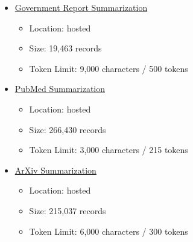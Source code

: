 \begin{itemize}
    \item \href{https://huggingface.co/datasets/ccdv/govreport-summarization?row=2}{Government Report Summarization}
    \begin{itemize}
        \item Location: hosted
        \item Size: 19,463 records
        \item Token Limit:  9,000 characters /  500 tokens
    \end{itemize}
    
    \item \href{https://huggingface.co/datasets/ccdv/pubmed-summarization?row=3}{PubMed Summarization}
    \begin{itemize}
        \item Location: hosted
        \item Size: 266,430 records
        \item Token Limit:  3,000 characters /  215 tokens
    \end{itemize}
    
    \item \href{https://huggingface.co/datasets/ccdv/arxiv-summarization}{ArXiv Summarization}
    \begin{itemize}
        \item Location: hosted
        \item Size: 215,037 records
        \item Token Limit:  6,000 characters /  300 tokens
    \end{itemize}
\end{itemize}
